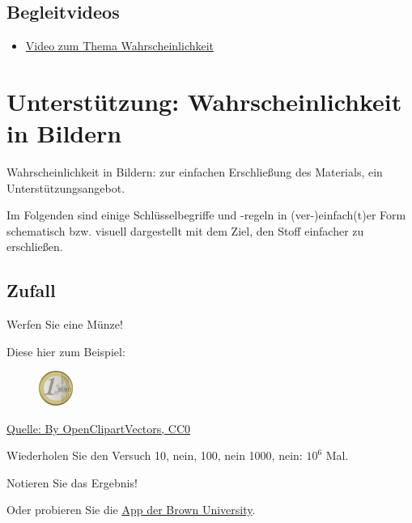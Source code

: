 \documentclass[
  a4paper,
  DIV=11]{scrreprt}
\providecommand{\tightlist}{%
  \setlength{\itemsep}{0pt}\setlength{\parskip}{0pt}}\usepackage{longtable,booktabs,array}
\theoremstyle{definition}
\theoremstyle{remark}
\begin{document}
\hypertarget{begleitvideos-1}{%
\subsection{Begleitvideos}\label{begleitvideos-1}}

\begin{itemize}
\tightlist
\item
  \href{https://youtu.be/rR6NspapEyo}{Video zum Thema
  Wahrscheinlichkeit}
\end{itemize}

\hypertarget{unterstuxfctzung-wahrscheinlichkeit-in-bildern}{%
\section{Unterstützung: Wahrscheinlichkeit in
Bildern}\label{unterstuxfctzung-wahrscheinlichkeit-in-bildern}}

Wahrscheinlichkeit in Bildern: zur einfachen Erschließung des Materials,
ein Unterstützungsangebot.

Im Folgenden sind einige Schlüsselbegriffe und -regeln in
(ver-)einfach(t)er Form schematisch bzw. visuell dargestellt mit dem
Ziel, den Stoff einfacher zu erschließen.

\hypertarget{zufall}{%
\subsection{Zufall}\label{zufall}}

Werfen Sie eine Münze!

Diese hier zum Beispiel:

\begin{figure}

{\centering \includegraphics[width=0.1\textwidth,height=\textheight]{./img/1024px-Coin-155597.svg.png}

}

\end{figure}

\href{https://pixabay.com/pt/moeda-euro-europa-fran\%C3\%A7a-dinheiro-155597}{Quelle:
By OpenClipartVectors, CC0}

Wiederholen Sie den Versuch 10, nein, 100, nein 1000, nein: \(10^6\)
Mal.

Notieren Sie das Ergebnis!

Oder probieren Sie die
\href{https://seeing-theory.brown.edu/basic-probability/index.html\#section1}{App
der Brown University}.
\end{document}

